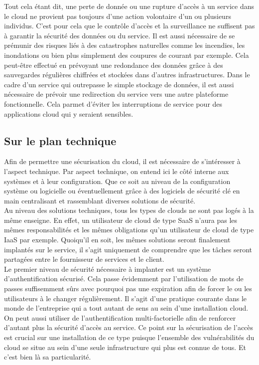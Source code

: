 \documentclass[a4paper, 12pt]{article}
\begin{document}
      Tout cela étant dit, une perte de donnée ou une rupture d'accès à un 
      service dans le cloud ne provient pas toujours d'une action volontaire 
      d'un ou plusieurs individus. C'est pour cela que le contrôle d'accès et 
      la surveillance ne suffisent pas à garantir la sécurité des données ou
      du service. Il est aussi nécessaire de se prémunir des risques liés à des
      catastrophes naturelles comme les incendies, les inondations ou bien 
      plus simplement des coupures de courant par exemple. Cela peut-être 
      effectué en prévoyant une redondance des données grâce à des sauvegardes 
      régulières chiffrées et stockées dans d'autres infrastructures. Dans le 
      cadre d'un service qui outrepasse le simple stockage de données, il est 
      aussi nécessaire de prévoir une redirection du service vers une autre 
      plateforme fonctionnelle. Cela parmet d'éviter les interruptions de 
      service pour des applications cloud qui y seraient sensibles.
      
    \subsection{Sur le plan technique}
      Afin de permettre une sécurisation du cloud, il est nécessaire de 
      s'intéresser à l'aspect technique. Par aspect technique, on entend ici
      le côté interne aux systèmes et à leur configuration. Que ce soit au 
      niveau de la configuration système ou logicielle ou éventuellement grâce 
      à des logiciels de sécurité clé en main centralisant et rassemblant 
      diverses solutions de sécurité. \\

      Au niveau des solutions techniques, tous les types de clouds ne sont pas
      logés à la même enseigne. En effet, un utilisateur de cloud de type SaaS
      n'aura pas les mêmes responsabilités et les mêmes obligations qu'un
      utilisateur de cloud de type IaaS par exemple. Quoiqu'il en soit, les
      mêmes solutions seront finalement implantés sur le service, il s'agit
      uniquement de comprendre que les tâches seront partagées entre le 
      fournisseur de services et le client. \\

      Le premier niveau de sécurité nécessaire à implanter est un système 
      d'authentification sécurisé. Cela passe évidemment par l'utilisation 
      de mots de passes suffisemment sûrs avec pourquoi pas une expiration
      afin de forcer le ou les utilisateurs à le changer régulièrement. Il 
      s'agit d'une pratique courante dans le monde de l'entreprise qui a tout
      autant de sens au sein d'une installation  cloud. On peut aussi utiliser 
      de l'authentification multi-factorielle afin de renforcer d'autant plus 
      la sécurité d'accès au service. Ce point sur la sécurisation de l'accès 
      est crucial sur une installation de ce type puisque l'ensemble des 
      vulnérabilités du cloud se situe au sein d'une seule infrastructure
      qui plus est connue de tous. Et c'est bien là sa particularité. \\
\end{document}
